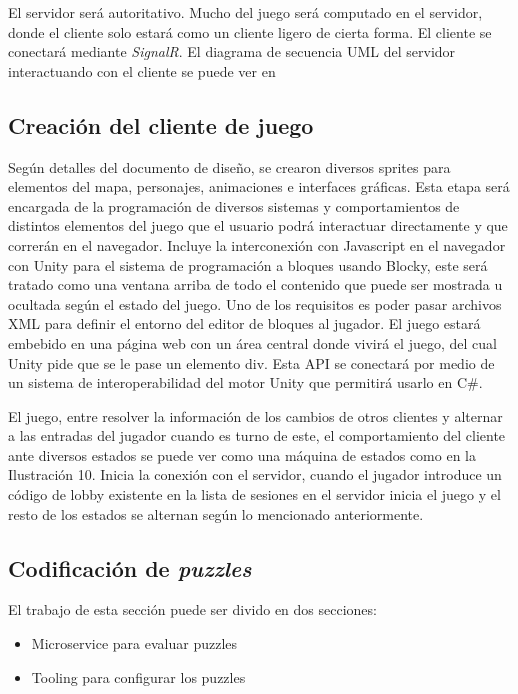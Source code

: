 El servidor será autoritativo. Mucho del juego será computado en el servidor, donde el cliente solo estará como un cliente ligero de cierta forma. 
El cliente se conectará mediante \textit{SignalR}.
El diagrama de secuencia UML del servidor interactuando con el cliente se puede ver en 

\subsection{Creación del cliente de juego}
Según detalles del documento de diseño, se crearon diversos sprites para elementos del mapa, personajes, animaciones e interfaces gráficas. Esta etapa será encargada de la programación de diversos sistemas y comportamientos de distintos elementos del juego que el usuario podrá interactuar directamente y que correrán en el navegador. Incluye la interconexión con Javascript en el navegador con Unity para el sistema de programación a bloques usando Blocky, este será tratado como una ventana arriba de todo el contenido que puede ser mostrada u ocultada según el estado del juego. Uno de los requisitos es poder pasar archivos XML para definir el entorno del editor de bloques al jugador.
El juego estará embebido en una página web con un área central donde vivirá el juego, del cual Unity pide que se le pase un elemento div. 
Esta API se conectará por medio de un sistema de interoperabilidad del motor Unity que permitirá usarlo en C#.

El juego, entre resolver la información de los cambios de otros clientes y alternar a las entradas del jugador cuando es turno de este, el comportamiento del cliente ante diversos estados se puede ver como una máquina de estados como en la Ilustración 10. Inicia la conexión con el servidor, cuando el jugador introduce un código de lobby existente en la lista de sesiones en el servidor inicia el juego y el resto de los estados se alternan según lo mencionado anteriormente.

\subsection{Codificación de \textit{puzzles}}
El trabajo de esta sección puede ser divido en dos secciones:
\begin{itemize}
    \item Microservice para evaluar puzzles
    \item Tooling para configurar los puzzles
\end{itemize}

